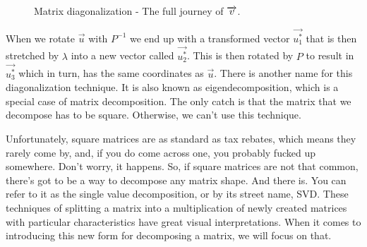 \documentclass[a4,12pt,twosided,openany]{memoir}
\begin{document}
\begin{figure}[h!]
\begin{center}
\end{center}
\caption{Matrix diagonalization - The full journey of $\protect\overrightarrow{v}$.}
\end{figure}
\par 
\indent

When we rotate $\overrightarrow{u}$ with $P^{-1}$ we end up with a transformed vector $\overrightarrow{u_1^*}$ that is then  stretched by $\lambda$ into a new vector called $\overrightarrow{u_2^*}$. This is then rotated by $P$ to result in $\overrightarrow{u_3^*}$ which in turn, has the same coordinates as $\overrightarrow{u}$. There is another name for this diagonalization technique. It is also known as eigendecomposition, which is a special case of matrix decomposition. The only catch is that the matrix that we decompose has to be square. Otherwise, we can’t use this technique. 
\par 
\indent
Unfortunately, square matrices are as standard as tax rebates, which means they rarely come by, and, if you do come across one, you probably fucked up somewhere. Don’t worry, it happens. So, if square matrices are not that common, there’s got to be a way to decompose any matrix shape. And there is. You can refer to it as the single value decomposition, or by its street name, SVD. These techniques of splitting a matrix into a multiplication of newly created matrices with particular characteristics have great visual interpretations. When it comes to introducing this new form for decomposing a matrix, we will focus on that.
\end{document}
